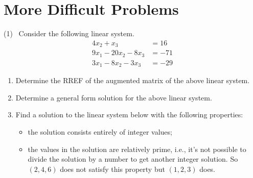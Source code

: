 \section{More Difficult Problems}
\begin{tasks}[resume, style=enumerate](1)
\task
  \faCalculator \ Consider the following linear system.
  \begin{align*}
    4x_2 + x_3 &= 16 \\
    9x_1 - 20x_2 - 8x_3 &= -71 \\
    3x_1 - 8x_2 - 3x_3 &= -29
  \end{align*}
  \begin{enumerate}[label=(\alph*)]
  \item Determine the RREF of the augmented matrix of the above linear
    system.
  \item Determine a general form solution for the above linear system.
  \item
    Find a solution to the linear system below with the following
    properties:
    \begin{itemize}
    \item
      the solution consists entirely of integer values;
    \item
      the values in the solution are relatively prime, i.e., it's not
      possible to divide the solution by a number to get another
      integer solution. So $(2, 4, 6)$ does not satisfy this property
      but $(1, 2, 3)$ does.\footnotemark
    \end{itemize}
  \end{enumerate}
\end{tasks}
